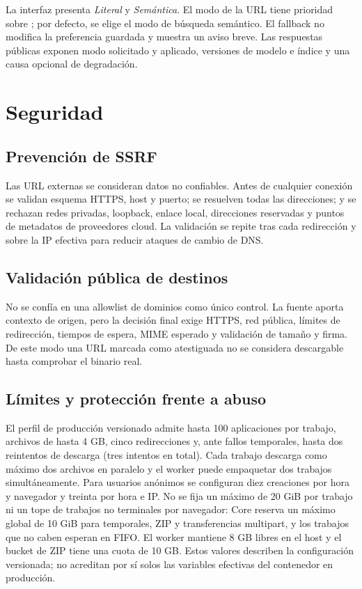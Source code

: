 La interfaz presenta \emph{Literal} y \emph{Semántica}. El modo de la URL tiene prioridad sobre ; por defecto, se elige el modo de búsqueda semántico. El fallback no modifica la preferencia guardada y muestra un aviso breve. Las respuestas públicas exponen modo solicitado y aplicado, versiones de modelo e índice y una causa opcional de degradación.

\section{Seguridad}

\subsection{Prevención de SSRF}

Las URL externas se consideran datos no confiables. Antes de cualquier conexión se validan esquema HTTPS, host y puerto; se resuelven todas las direcciones; y se rechazan redes privadas, loopback, enlace local, direcciones reservadas y puntos de metadatos de proveedores cloud. La validación se repite tras cada redirección y sobre la IP efectiva para reducir ataques de cambio de DNS.

\subsection{Validación pública de destinos}

No se confía en una allowlist de dominios como único control. La fuente aporta contexto de origen, pero la decisión final exige HTTPS, red pública, límites de redirección, tiempos de espera, MIME esperado y validación de tamaño y firma. De este modo una URL marcada como atestiguada no se considera descargable hasta comprobar el binario real.

\subsection{Límites y protección frente a abuso}

El perfil de producción versionado admite hasta 100 aplicaciones por trabajo, archivos de hasta 4 GB, cinco redirecciones y, ante fallos temporales, hasta dos reintentos de descarga (tres intentos en total). Cada trabajo descarga como máximo dos archivos en paralelo y el worker puede empaquetar dos trabajos simultáneamente. Para usuarios anónimos se configuran diez creaciones por hora y navegador y treinta por hora e IP. No se fija un máximo de 20 GiB por trabajo ni un tope de trabajos no terminales por navegador: Core reserva un máximo global de 10 GiB para temporales, ZIP y transferencias multipart, y los trabajos que no caben esperan en FIFO. El worker mantiene 8 GB libres en el host y el bucket de ZIP tiene una cuota de 10 GB. Estos valores describen la configuración versionada; no acreditan por sí solos las variables efectivas del contenedor en producción.


